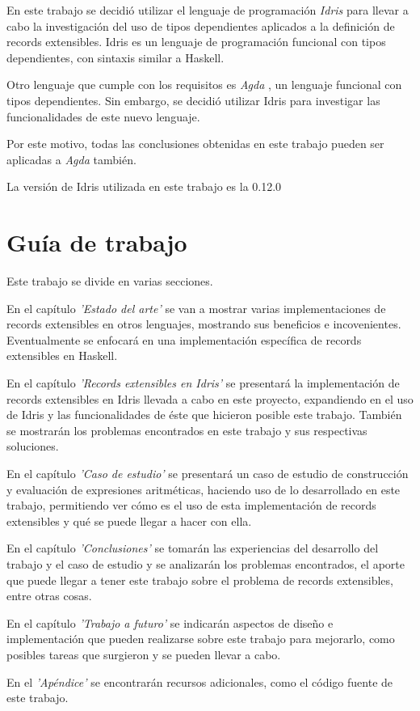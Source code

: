 En este trabajo se decidió utilizar el lenguaje de programación \textit{Idris} \cite{brady:idris-jfp13} para llevar a cabo la investigación del uso de tipos dependientes aplicados a la definición de records extensibles. Idris es un lenguaje de programación funcional con tipos dependientes, con sintaxis similar a Haskell.

Otro lenguaje que cumple con los requisitos es \textit{Agda} \cite{Norell:2009:DTP:1481861.1481862}, un lenguaje funcional con tipos dependientes. Sin embargo, se decidió utilizar Idris para investigar las funcionalidades de este nuevo lenguaje.

Por este motivo, todas las conclusiones obtenidas en este trabajo pueden ser aplicadas a \textit{Agda} también.

La versión de Idris utilizada en este trabajo es la 0.12.0

\section{Guía de trabajo}

Este trabajo se divide en varias secciones.

En el capítulo \textit{'Estado del arte'} se van a mostrar varias implementaciones de records extensibles en otros lenguajes, mostrando sus beneficios e incovenientes. Eventualmente se enfocará en una implementación específica de records extensibles en Haskell.

En el capítulo \textit{'Records extensibles en Idris'} se presentará la implementación de records extensibles en Idris llevada a cabo en este proyecto, expandiendo en el uso de Idris y las funcionalidades de éste que hicieron posible este trabajo. También se mostrarán los problemas encontrados en este trabajo y sus respectivas soluciones.

En el capítulo \textit{'Caso de estudio'} se presentará un caso de estudio de construcción y evaluación de expresiones aritméticas, haciendo uso de lo desarrollado en este trabajo, permitiendo ver cómo es el uso de esta implementación de records extensibles y qué se puede llegar a hacer con ella.

En el capítulo \textit{'Conclusiones'} se tomarán las experiencias del desarrollo del trabajo y el caso de estudio y se analizarán los problemas encontrados, el aporte que puede llegar a tener este trabajo sobre el problema de records extensibles, entre otras cosas.

En el capítulo \textit{'Trabajo a futuro'} se indicarán aspectos de diseño e implementación que pueden realizarse sobre este trabajo para mejorarlo, como posibles tareas que surgieron y se pueden llevar a cabo.

En el \textit{'Apéndice'} se encontrarán recursos adicionales, como el código fuente de este trabajo.

